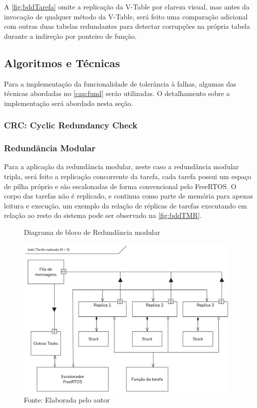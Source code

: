 A \autoref{fig:bddTarefa} omite a replicação da V-Table por clareza visual, mas antes da invocação de qualquer método da V-Table, será feito uma comparação adicional com outras duas tabelas redundantes para detectar corrupções na própria tabela durante a indireção por ponteiro de função.

\subsection{Algoritmos e Técnicas} \label{subsec:algoritmos}

Para a implementação da funcionalidade de tolerância à falhas, algumas das técnicas abordadas no \autoref{cap:fund} serão utilizadas. O detalhamento sobre a implementação será abordado nesta seção.

\subsubsection{CRC: Cyclic Redundancy Check}

\subsubsection{Redundância Modular}

Para a aplicação da redundância modular, neste caso a redundância modular tripla, será feito a replicação concorrente da tarefa, cada tarefa possui um espaço de pilha próprio e são escalonadas de forma convencional pelo FreeRTOS. O corpo das tarefas não é replicado, e continua como parte de memória para apenas leitura e execução, um exemplo da relação de réplicas de tarefas executando em relação ao resto do sistema pode ser observado na \autoref{fig:bddTMR}.

\begin{figure}[H]
    \centering
    \captionsetup{justification=centering}
    \caption{Diagrama de bloco de Redundância modular}
    \includegraphics[width=0.975\textwidth]{assets/tmr_bdd.png}
    \captionsetup{justification=raggedright}
    \caption*{Fonte: Elaborada pelo autor}
    \label{fig:bddTMR}
\end{figure}

